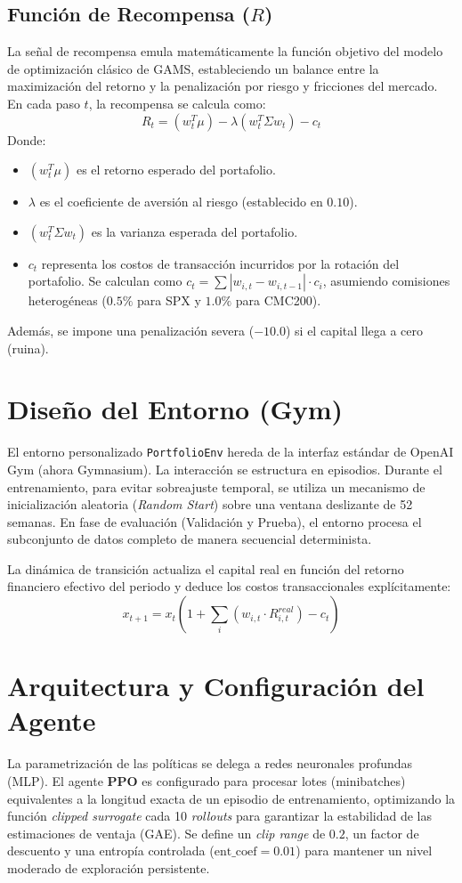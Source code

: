 \subsection{Función de Recompensa ($R$)}
La señal de recompensa emula matemáticamente la función objetivo del modelo de optimización clásico de GAMS, estableciendo un balance entre la maximización del retorno y la penalización por riesgo y fricciones del mercado. En cada paso $t$, la recompensa se calcula como:
\begin{equation}
    R_t = (w_t^T \mu) - \lambda (w_t^T \Sigma w_t) - c_t
\end{equation}
Donde:
\begin{itemize}
    \item $(w_t^T \mu)$ es el retorno esperado del portafolio.
    \item $\lambda$ es el coeficiente de aversión al riesgo (establecido en $0.10$).
    \item $(w_t^T \Sigma w_t)$ es la varianza esperada del portafolio.
    \item $c_t$ representa los costos de transacción incurridos por la rotación del portafolio. Se calculan como $c_t = \sum |w_{i,t} - w_{i,t-1}| \cdot c_i$, asumiendo comisiones heterogéneas ($0.5\%$ para SPX y $1.0\%$ para CMC200).
\end{itemize}
Además, se impone una penalización severa ($-10.0$) si el capital llega a cero (ruina).

\section{Diseño del Entorno (Gym)}
El entorno personalizado \texttt{PortfolioEnv} hereda de la interfaz estándar de OpenAI Gym (ahora Gymnasium). La interacción se estructura en episodios. Durante el entrenamiento, para evitar sobreajuste temporal, se utiliza un mecanismo de inicialización aleatoria (\textit{Random Start}) sobre una ventana deslizante de 52 semanas. En fase de evaluación (Validación y Prueba), el entorno procesa el subconjunto de datos completo de manera secuencial determinista.

La dinámica de transición actualiza el capital real en función del retorno financiero efectivo del periodo y deduce los costos transaccionales explícitamente:
\begin{equation}
    x_{t+1} = x_t \left( 1 + \sum_{i} (w_{i,t} \cdot R_{i,t}^{real}) - c_t \right)
\end{equation}

\section{Arquitectura y Configuración del Agente}
La parametrización de las políticas se delega a redes neuronales profundas (MLP). El agente \textbf{PPO} es configurado para procesar lotes (minibatches) equivalentes a la longitud exacta de un episodio de entrenamiento, optimizando la función \textit{clipped surrogate} cada 10 \textit{rollouts} para garantizar la estabilidad de las estimaciones de ventaja (GAE). Se define un \textit{clip range} de $0.2$, un factor de descuento y una entropía controlada ($\text{ent\_coef} = 0.01$) para mantener un nivel moderado de exploración persistente.

